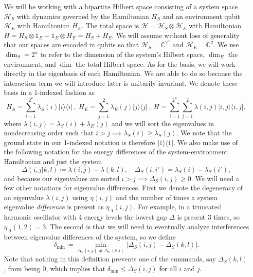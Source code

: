 \documentclass[
 amsmath,amssymb,
 aps,
onecolumn, 
nofootinbib]{revtex4-2}
\newcommand{\ketbra}[2]{| #1\rangle\! \langle #2|}
\newcommand{\hilb}{\mathcal{H}}
\newcommand{\identity}{\mathds{1}}
\begin{document}
We will be working with a bipartite Hilbert space consisting of a system space $\hilb_S$ with dynamics governed by the Hamiltonian $H_S$ and an environment qubit $\hilb_E$ with Hamiltonian $H_E$. The total space is $\hilb = \hilb_S \otimes \hilb_E$ with Hamiltonian $H = H_S \otimes \identity_E + \identity_E \otimes H_E = H_S + H_E$. We will assume without loss of generality that our spaces are encoded in qubits so that $\hilb_S = \mathbb{C}^{2^n}$ and $\hilb_E = \mathbb{C}^{2}$. We use $\dim_S = 2^n$ to refer to the dimension of the system's Hilbert space, $\dim_E$ the environment, and $\dim$ the total Hilbert space. As for the basis, we will work directly in the eigenbasis of each Hamiltonian. We are able to do so because the interaction term we will introduce later is unitarily invariant. We denote these basis in a 1-indexed fashion as
\begin{equation}
    H_{S} = \sum_{i = 1}^{2^n} \lambda_S(i) \ketbra{i}{i} ~,~ H_{E} = \sum_{j=1}^{2 } \lambda_E(j) \ketbra{j}{j} ~,~ H = \sum_{i=1}^{2^n } \sum_{j=1}^{2} \lambda(i,j) \ketbra{i,j}{i,j},
\end{equation}
where $\lambda(i,j) = \lambda_S(i) + \lambda_E(j)$ and we will sort the eigenvalues in nondecreasing order such that $i > j \implies \lambda_S(i) \geq \lambda_S(j)$. We note that the ground state in our 1-indexed notation is therefore $\ketbra{1}{1}$. We also make use of the following notation for the energy differences of the system-environment Hamiltonian and just the system
\begin{equation}
\Delta(i,j|k,l) \coloneqq \lambda(i,j) - \lambda(k,l), \quad \Delta_S(i,i') = \lambda_S(i) - \lambda_S(i'), \label{eq:delta_def}
\end{equation}
and because our eigenvalues are sorted $i > j \implies \Delta_S(i,j) \geq 0$. We will need a few other notations for eigenvalue differences. First we denote the degeneracy of an eigenvalue $\lambda(i,j)$ using $\eta(i,j)$ and the number of times a system eigenvalue \emph{difference} is present as $\eta_\Delta(i,j)$. For example, in a truncated harmonic oscillator with 4 energy levels the lowest gap $\Delta$ is present 3 times, so $\eta_\Delta(1, 2) = 3$. The second is that we will need to eventually analyze interferences between eigenvalue differences of the system, so we define
\begin{equation}
    \delta_{\min} \coloneqq \min_{\Delta_S(i,j) \neq \Delta_S(k,l)} \left| \Delta_S(i,j) - \Delta_S(k, l) \right|. \label{eq:delta_min_def}
\end{equation}
Note that nothing in this definition prevents one of the summands, say $\Delta_S(k,l)$, from being 0, which implies that $\delta_{\min} \leq \Delta_S(i,j)$ for all $i$ and $j$.
\end{document}
